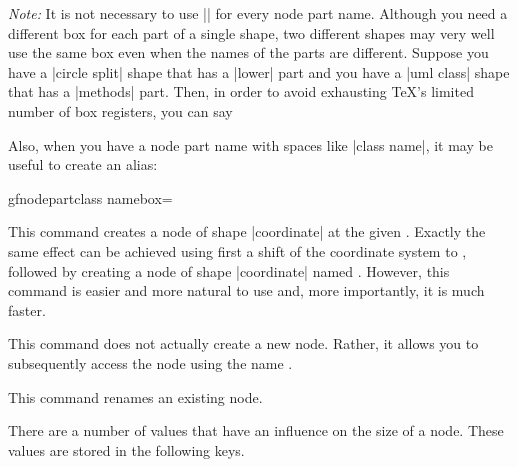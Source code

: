 \begin{command}{\pgfmultipartnode{}}
    \emph{Note:} It is not necessary to use |\newbox| for every node part
    name. Although you need a different box for each part of a single shape,
    two different shapes may very well use the same box even when the names of
    the parts are different. Suppose you have a |circle split| shape that has a
    |lower| part and you have a |uml class| shape that has a |methods| part.
    Then, in order to avoid exhausting \TeX's limited number of box registers,
    you can say
\begin{codeexample}
\newbox\pgfnodepartlowerbox
\let\pgfnodepartmethodsbox=\pgfnodepartlowerbox
\end{codeexample}
    Also, when you have a node part name with spaces like |class name|, it may
    be useful to create an alias:
\begin{codeexample}
\newbox\mybox
\expandafter\let\csname pgfnodepartclass namebox\endcsname=\mybox
\end{codeexample}
\end{command}

\begin{command}{\pgfcoordinate{}}
    This command creates a node of shape |coordinate| at the given
    . Exactly the same effect can be achieved using first a
    shift of the coordinate system to , followed by creating a
    node of shape |coordinate| named . However, this command is
    easier and more natural to use and, more importantly, it is much faster.
\end{command}

\begin{command}{\pgfnodealias{}}
    This command does not actually create a new node. Rather, it allows you to
    subsequently access the node  using the name .
\end{command}

\begin{command}{\pgfnoderename{}}
    This command renames an existing node.
\end{command}

There are a number of values that have an influence on the size of a node.
These values are stored in the following keys.

